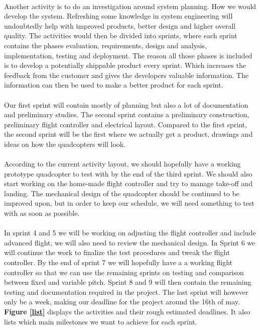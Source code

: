 \\
Another activity is to do an investigation around system planning. How we would develop the system. Refreshing some knowledge in system engineering will undoubtedly help with improved products, better design and higher overall quality.
The activities would then be divided into sprints, where each sprint contains the phases evaluation, requirements, design and analysis, implementation, testing and deployment. The reason all those phases is included is to develop a potentially shippable product every sprint. Which increases the feedback from the customer and gives the developers valuable information. The information can then be used to make a better product for each sprint. \\
\\
Our first sprint will contain mostly of planning but also a lot of documentation and preliminary studies. The second sprint contains a preliminary construction, preliminary flight controller and electrical layout. Compared to the first sprint, the second sprint will be the first where we actually get a product, drawings and ideas on how the quadcopters will look. \\
\\
According to the current activity layout, we should hopefully have a working prototype quadcopter to test with by the end of the third sprint. We should also start working on the home-made flight controller and try to manage take-off and landing. The mechanical design of the quadcopter should be continued to be improved upon, but in order to keep our schedule, we will need something to test with as soon as possible. \\
\\
In sprint 4 and 5 we will be working on adjusting the flight controller and include advanced flight, we will also need to review the mechanical design. 
In Sprint 6 we will continue the work to finalize the test procedures and tweak the flight controller. By the end of sprint 7 we will hopefully have a a working flight controller so that we can use the remaining sprints on testing and comparison between fixed and variable pitch. 
Sprint 8 and 9 will then contain the remaining testing and documentation required in the project. The last sprint will however only be a week, making our deadline for the project around the 16th of may. 
\textbf{Figure \ref{list}} displays the activities and their rough estimated deadlines. It also lists which main milestones we want to achieve for each sprint. 
\\

